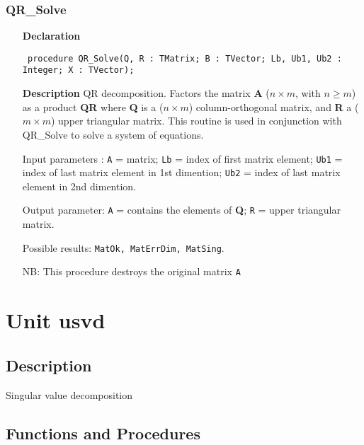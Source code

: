 \documentclass[12pt,a4paper,oneside]{report}
\newcommand{\declarationitem}[1]{\textbf{#1}}
\newcommand{\descriptiontitle}[1]{\textbf{#1}}
\newcommand{\code}[1]{\texttt{#1}}
\begin{document}
\subsubsection{QR{\_}Solve}
\label{uqr-QR_Solve}
\begin{itemize}\item[\declarationitem{Declaration}\hfill]
	\begin{flushleft}
		\code{
			procedure QR{\_}Solve(Q, R : TMatrix; B : TVector; Lb, Ub1, Ub2 : Integer; X : TVector);}
		
	\end{flushleft}
	
	\par
	\item[\descriptiontitle{Description}]
	QR decomposition. Factors the matrix \textbf{A} ($n \times m$, with $n \ge m $) as a product \textbf{QR} where \textbf{Q} is a ($n \times m$) column{-}orthogonal matrix, and \textbf{R} a ($m \times m$) upper triangular matrix. This routine is used in conjunction with QR{\_}Solve to solve a system of equations.
	
	Input parameters : \code{A} = matrix; \code{Lb} = index of first matrix element; \code{Ub1} = index of last matrix element in 1st dimention; \code{Ub2} = index of last matrix element in 2nd dimention.
	
	Output parameter: \code{A} = contains the elements of \textbf{Q}; \code{R} = upper triangular matrix.
	
	Possible results: \code{MatOk, MatErrDim, MatSing}.
	
	NB: This procedure destroys the original matrix \code{A}
	
\end{itemize}
\section{Unit usvd}
\label{usvd}
\subsection{Description}
Singular value decomposition 
\subsection{Functions and Procedures}
\end{document}
